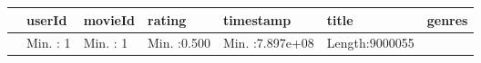 \documentclass[
]{article}
\newenvironment{Shaded}{\begin{snugshade}}{\end{snugshade}}
\newcommand{\KeywordTok}[1]{\textcolor[rgb]{0.13,0.29,0.53}{\textbf{#1}}}
\newcommand{\NormalTok}[1]{#1}
\newcommand{\OperatorTok}[1]{\textcolor[rgb]{0.81,0.36,0.00}{\textbf{#1}}}
\newcommand{\StringTok}[1]{\textcolor[rgb]{0.31,0.60,0.02}{#1}}
\begin{document}
\begin{Shaded}
\end{Shaded}

\begin{longtable}[]{@{}lllllll@{}}
\toprule
\begin{minipage}[b]{0.02\columnwidth}\raggedright
\strut
\end{minipage} & \begin{minipage}[b]{0.12\columnwidth}\raggedright
userId\strut
\end{minipage} & \begin{minipage}[b]{0.12\columnwidth}\raggedright
movieId\strut
\end{minipage} & \begin{minipage}[b]{0.12\columnwidth}\raggedright
rating\strut
\end{minipage} & \begin{minipage}[b]{0.15\columnwidth}\raggedright
timestamp\strut
\end{minipage} & \begin{minipage}[b]{0.14\columnwidth}\raggedright
title\strut
\end{minipage} & \begin{minipage}[b]{0.14\columnwidth}\raggedright
genres\strut
\end{minipage}\tabularnewline
\midrule
\endhead
\begin{minipage}[t]{0.02\columnwidth}\raggedright
\strut
\end{minipage} & \begin{minipage}[t]{0.12\columnwidth}\raggedright
Min. : 1\strut
\end{minipage} & \begin{minipage}[t]{0.12\columnwidth}\raggedright
Min. : 1\strut
\end{minipage} & \begin{minipage}[t]{0.12\columnwidth}\raggedright
Min. :0.500\strut
\end{minipage} & \begin{minipage}[t]{0.15\columnwidth}\raggedright
Min. :7.897e+08\strut
\end{minipage} & \begin{minipage}[t]{0.14\columnwidth}\raggedright
Length:9000055\strut
\end{minipage} & \begin{minipage}[t]{0.14\columnwidth}\raggedright

\end{minipage}
\end{longtable}
\end{document}
